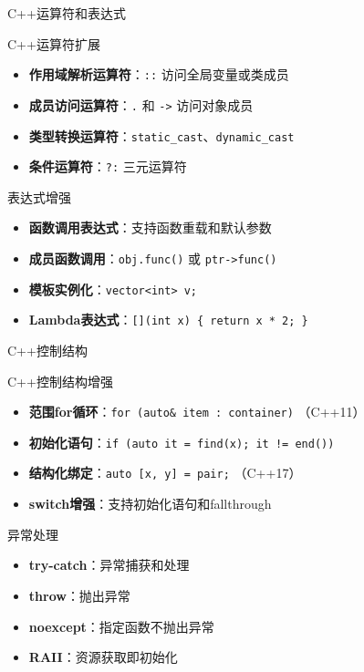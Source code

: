 \documentclass[UTF8,aspectratio=169]{beamer}
\begin{document}
\begin{frame}{C++运算符和表达式}
    \begin{ytublock}{C++运算符扩展}
        \begin{itemize}
            \item \textbf{作用域解析运算符}：\texttt{::} 访问全局变量或类成员
            \item \textbf{成员访问运算符}：\texttt{.} 和 \texttt{->} 访问对象成员
            \item \textbf{类型转换运算符}：\texttt{static\_cast}、\texttt{dynamic\_cast}
            \item \textbf{条件运算符}：\texttt{?:} 三元运算符
        \end{itemize}
    \end{ytublock}

    \begin{ytublock}{表达式增强}
        \begin{itemize}
            \item \textbf{函数调用表达式}：支持函数重载和默认参数
            \item \textbf{成员函数调用}：\texttt{obj.func()} 或 \texttt{ptr->func()}
            \item \textbf{模板实例化}：\texttt{vector<int> v;}
            \item \textbf{Lambda表达式}：\texttt{[](int x) \{ return x * 2; \}}
        \end{itemize}
    \end{ytublock}
\end{frame}

\begin{frame}{C++控制结构}
    \begin{ytublock}{C++控制结构增强}
        \begin{itemize}
            \item \textbf{范围for循环}：\texttt{for (auto\& item : container)} （C++11）
            \item \textbf{初始化语句}：\texttt{if (auto it = find(x); it != end())}
            \item \textbf{结构化绑定}：\texttt{auto [x, y] = pair;} （C++17）
            \item \textbf{switch增强}：支持初始化语句和fallthrough
        \end{itemize}
    \end{ytublock}

    \begin{ytublock}{异常处理}
        \begin{itemize}
            \item \textbf{try-catch}：异常捕获和处理
            \item \textbf{throw}：抛出异常
            \item \textbf{noexcept}：指定函数不抛出异常
            \item \textbf{RAII}：资源获取即初始化
        \end{itemize}
    \end{ytublock}
\end{frame}
\end{document}
